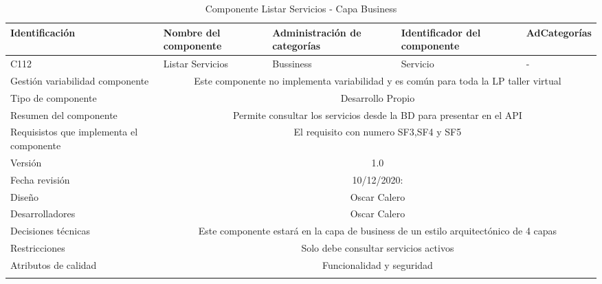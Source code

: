 \documentclass[10pt,a4paper,openany]{book}
\begin{document}
\begin{longtable}{|p{3cm}|p{3cm}|p{3cm}|p{3cm}|p{3cm}|} \hline
Identificación & Nombre del componente & Administración de categorías & Identificador del componente & AdCategorías \\[0.5ex] \hline
C112& Listar Servicios& Bussiness& Servicio& -\\[0.5ex] \hline
Gestión variabilidad componente & \multicolumn{4}{|c|}{Este componente no implementa variabilidad y es común para toda la LP taller virtual} \\ \hline
Tipo de componente & \multicolumn{4}{|c|}{Desarrollo Propio} \\ \hline
Resumen del componente & \multicolumn{4}{|c|}{Permite consultar los servicios desde la BD para presentar en el API} \\ \hline
Requisistos que implementa el componente & \multicolumn{4}{|c|}{El requisito con numero SF3,SF4 y SF5 } \\ \hline
Versión & \multicolumn{4}{|c|}{1.0 } \\ \hline
Fecha revisión & \multicolumn{4}{|c|}{ 10/12/2020:} \\ \hline
Diseño & \multicolumn{4}{|c|}{Oscar Calero} \\ \hline
Desarrolladores & \multicolumn{4}{|c|}{Oscar Calero} \\ \hline
Decisiones técnicas & \multicolumn{4}{|c|}{Este componente estará en la capa de business de un estilo arquitectónico de 4 capas  } \\ \hline
Restricciones & \multicolumn{4}{|c|}{Solo debe consultar servicios activos} \\ \hline
Atributos de calidad & \multicolumn{4}{|c|}{Funcionalidad y seguridad} \\ \hline
\caption{Componente Listar Servicios - Capa Business}
\label{table:t6}
\end{longtable}
\end{document}
